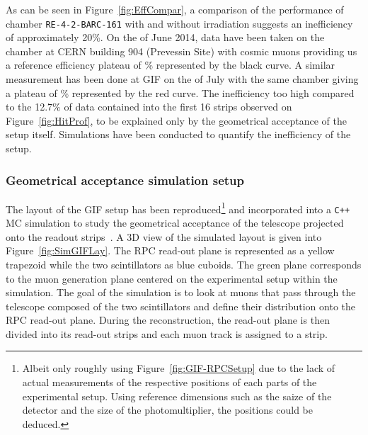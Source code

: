 	As can be seen in Figure~\ref{fig:EffCompar}, a comparison of the performance of chamber \texttt{RE-4-2-BARC-161} with and without irradiation suggests an inefficiency of approximately 20\%. On the  of June 2014, data have been taken on the chamber at CERN building 904 (Prevessin Site) with cosmic muons providing us a reference efficiency plateau of \% represented by the black curve. A similar measurement has been done at GIF on the  of July with the same chamber giving a plateau of \% represented by the red curve. The inefficiency too high compared to the 12.7\% of data contained into the first 16 strips observed on Figure~\ref{fig:HitProf}, to be explained only by the geometrical acceptance of the setup itself. Simulations have been conducted to quantify the inefficiency of the setup.
	
\endgroup
		
		\subsubsection{Geometrical acceptance simulation setup}
		\label{chapt5:sssec:GeoSim}
		
	The layout of the GIF setup has been reproduced\footnote{Albeit only roughly using Figure~\ref{fig:GIF-RPCSetup} due to the lack of actual measurements of the respective positions of each parts of the experimental setup. Using reference dimensions such as the saize of the detector and the size of the photomultiplier, the positions could be deduced.} and incorporated into a \texttt{C++} \acf{MC} simulation to study the geometrical acceptance of the telescope projected onto the readout strips~\cite{GEOACCEPT}. A 3D view of the simulated layout is given into Figure~\ref{fig:SimGIFLay}. The RPC read-out plane is represented as a yellow trapezoid while the two scintillators as blue cuboids. The green plane corresponds to the  muon generation plane centered on the experimental setup within the simulation. The goal of the simulation is to look at muons that pass through the telescope composed of the two scintillators and define their distribution onto the RPC read-out plane. During the reconstruction, the read-out plane is then divided into its read-out strips and each muon track is assigned to a strip.
	
